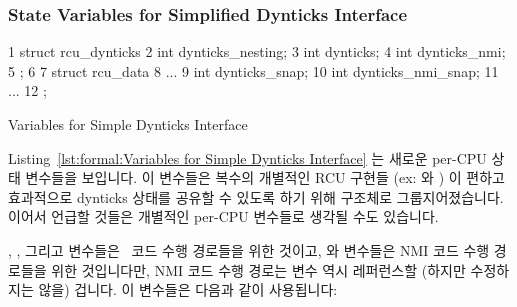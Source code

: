 \subsubsection{State Variables for Simplified Dynticks Interface}
\label{sec:formal:State Variables for Simplified Dynticks Interface}

\begin{listing}[tbp]
{ \scriptsize
\begin{verbbox}
  1 struct rcu_dynticks {
  2   int dynticks_nesting;
  3   int dynticks;
  4   int dynticks_nmi;
  5 };
  6
  7 struct rcu_data {
  8   ...
  9   int dynticks_snap;
 10   int dynticks_nmi_snap;
 11   ...
 12 };
\end{verbbox}
}
\centering
\theverbbox
\caption{Variables for Simple Dynticks Interface}
\label{lst:formal:Variables for Simple Dynticks Interface}
\end{listing}

Listing~\ref{lst:formal:Variables for Simple Dynticks Interface}
는 새로운 per-CPU 상태 변수들을 보입니다.
이 변수들은 복수의 개별적인 RCU 구현들 (ex:  와 ) 이 편하고
효과적으로 dynticks 상태를 공유할 수 있도록 하기 위해 구조체로
그룹지어졌습니다.
이어서 언급할 것들은 개별적인 per-CPU 변수들로 생각될 수도 있습니다.

, , 그리고  변수들은 \IRQ\
코드 수행 경로들을 위한 것이고,  와 
변수들은 NMI 코드 수행 경로들을 위한 것입니다만, NMI 코드 수행 경로는
 변수 역시 레퍼런스할 (하지만 수정하지는 않을) 겁니다.
이 변수들은 다음과 같이 사용됩니다:
\iffalse

Listing~\ref{lst:formal:Variables for Simple Dynticks Interface}
shows the new per-CPU state variables.
These variables are grouped into structs to allow multiple independent
RCU implementations (e.g., \co{rcu} and \co{rcu_bh}) to conveniently
and efficiently share dynticks state.
In what follows, they can be thought of as independent per-CPU variables.

The \co{dynticks_nesting}, \co{dynticks}, and \co{dynticks_snap} variables
are for the \IRQ\ code paths, and the \co{dynticks_nmi} and
\co{dynticks_nmi_snap} variables are for the NMI code paths, although
the NMI code path will also reference (but not modify) the
\co{dynticks_nesting} variable.
These variables are used as follows:
\fi

